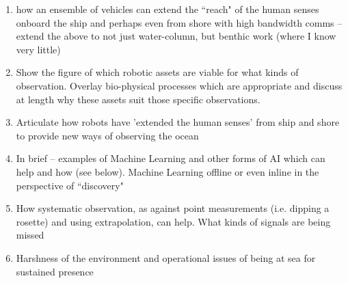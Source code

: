 \begin{enumerate} 


  \item how an ensemble of vehicles can extend the “reach" of the
    human senses onboard the ship and perhaps even from shore with
    high bandwidth comms -- extend the above to not just water-column,
    but benthic work (where I know very little)

  \item Show the figure of which robotic assets are viable for what
    kinds of observation. Overlay bio-physical processes which are
    appropriate and discuss at length why these assets suit those
    specific observations.

  \item Articulate how robots have 'extended the human senses' from
    ship and shore to provide new ways of observing the ocean

  \item In brief -- examples of Machine Learning and other forms of AI
    which can help and how (see below). Machine Learning offline or
    even inline in the perspective of “discovery"

  \item How systematic observation, as against point measurements
    (i.e. dipping a rosette) and using extrapolation, can help. What
    kinds of signals are being missed

  \item Harshness of the environment and operational issues of being
    at sea for sustained presence

\end{enumerate}
